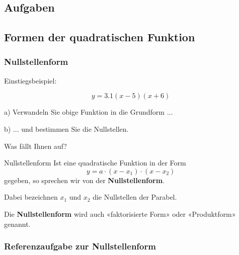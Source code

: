 \subsection*{Aufgaben}

\newpage

\subsection{Formen der quadratischen Funktion}
\subsubsection{Nullstellenform}

Einstiegsbeispiel:


$$y = 3.1(x-5)(x+6)$$

a) Verwandeln Sie obige Funktion in die Grundform ...


b) ... und bestimmen Sie die Nullstellen.


Was fällt Ihnen auf?




\newpage

\begin{gesetz}{Nullstellenform}{}
Ist eine quadratische Funktion in der Form
$$y = a\cdot{}(x-x_1)\cdot{}(x-x_2)$$
gegeben, so sprechen wir von der \textbf{Nullstellenform}.

Dabei bezeichnen  $x_1$ und $x_2$ die Nullstellen der Parabel.
  \end{gesetz}



Die \textbf{Nullstellenform} wird auch  «faktorisierte Form» oder
«Produktform» genannt.


\newpage


\subsubsection*{Referenzaufgabe zur Nullstellenform}



